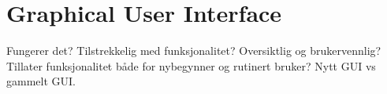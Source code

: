 \section{Graphical User Interface}
Fungerer det? Tilstrekkelig med funksjonalitet? Oversiktlig og brukervennlig? Tillater funksjonalitet både for nybegynner og rutinert bruker? Nytt GUI vs gammelt GUI.
